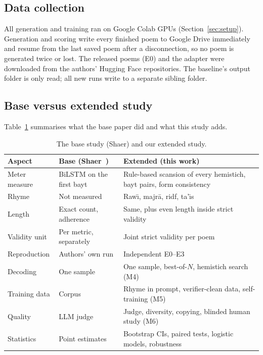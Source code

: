 \subsection{Data collection}
All generation and training ran on Google Colab GPUs (Section~\ref{sec:setup}). Generation and scoring write every
finished poem to Google Drive immediately and resume from the last saved poem after a disconnection, so no poem is
generated twice or lost. The released poems (E0) and the adapter were downloaded from the authors' Hugging Face
repositories. The baseline's output folder is only read; all new runs write to a separate sibling folder.

\subsection{Base versus extended study}
Table~\ref{tab:base-ext} summarises what the base paper did and what this study adds.

\begin{table}[t]
\centering
\caption{The base study (Shaer) and our extended study.}
\label{tab:base-ext}
\footnotesize
\begin{tabularx}{\columnwidth}{@{}>{\raggedright\arraybackslash}p{1.45cm} >{\raggedright\arraybackslash}X >{\raggedright\arraybackslash}X@{}}
\toprule
Aspect & Base (Shaer~\cite{abbas2026shaer}) & Extended (this work) \\
\midrule
Meter measure & BiLSTM on the first bayt & Rule-based scansion of every hemistich, bayt pairs, form consistency \\
Rhyme & Not measured & Raw\={\i}, majr\=a, ridf, ta'\={\i}s \\
Length & Exact count, adherence & Same, plus even length inside strict validity \\
Validity unit & Per metric, separately & Joint strict validity per poem \\
Reproduction & Authors' own run & Independent E0--E3 \\
Decoding & One sample & One sample, best-of-$N$, hemistich search (M4) \\
Training data & Corpus & Rhyme in prompt, verifier-clean data, self-training (M5) \\
Quality & LLM judge & Judge, diversity, copying, blinded human study (M6) \\
Statistics & Point estimates & Bootstrap CIs, paired tests, logistic models, robustness \\
\bottomrule
\end{tabularx}
\end{table}
